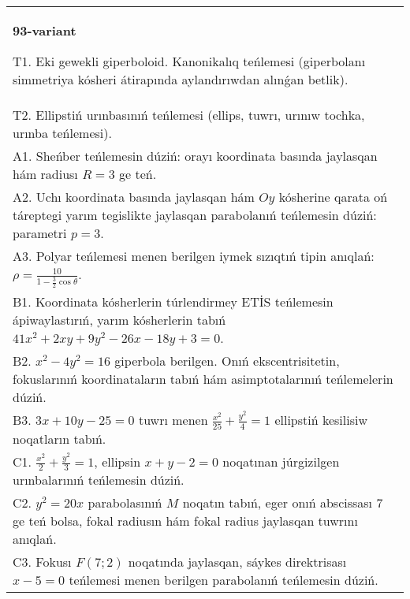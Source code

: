 \documentclass{article}
\begin{document}
\begin{tabular}{m{17cm}}
\textbf{93-variant}
\newline

T1. Eki gewekli giperboloid. Kanonikalıq teńlemesi (giperbolanı simmetriya kósheri átirapında aylandırıwdan alınǵan betlik).\\

T2. Ellipstiń urınbasınıń teńlemesi (ellips, tuwrı, urınıw tochka, urınba teńlemesi).\\

A1. Sheńber teńlemesin dúziń: orayı koordinata basında jaylasqan hám radiusı $R=3$ ge teń.\\

A2. Uchı koordinata basında jaylasqan hám $Oy$ kósherine qarata oń táreptegi yarım tegislikte jaylasqan parabolanıń teńlemesin dúziń: parametri $p=3$.\\

A3. Polyar teńlemesi menen berilgen iymek sızıqtıń tipin anıqlań: $\rho=\frac{10}{1-\frac{3}{2}\cos\theta}$.\\

B1. Koordinata kósherlerin túrlendirmey ETİS teńlemesin ápiwaylastırıń, yarım kósherlerin tabıń $41x^{2} + 2xy + 9y^{2} - 26x - 18y + 3 = 0$.  \\

B2. $x^{2} - 4y^{2} = 16$ giperbola berilgen. Onıń ekscentrisitetin, fokuslarınıń koordinataların tabıń hám asimptotalarınıń teńlemelerin dúziń.\\

B3. $3x + 10y - 25 = 0$ tuwrı menen $\frac{x^{2}}{25} + \frac{y^{2}}{4} = 1$ ellipstiń kesilisiw noqatların tabıń.\\

C1. $\frac{x^{2}}{2} + \frac{y^{2}}{3} = 1$, ellipsin $x + y - 2 = 0$ noqatınan júrgizilgen urınbalarınıń teńlemesin dúziń.  \\

C2. $y^{2} = 20x$ parabolasınıń $M$ noqatın tabıń, eger onıń abscissası 7 ge teń bolsa, fokal radiusın hám fokal radius jaylasqan tuwrını anıqlań.\\

C3. Fokusı $F(7;2)$ noqatında jaylasqan, sáykes direktrisası $x - 5 = 0$ teńlemesi menen berilgen parabolanıń teńlemesin dúziń.  \\

\end{tabular}
\vspace{1cm}
\end{document}
